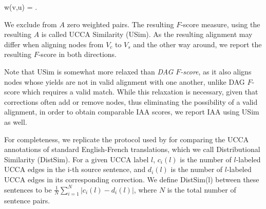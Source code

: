 \documentclass[a4paper, 11pt]{article}
\newenvironment{myequation*}{
	\vspace{-1em}
	\begin{equation*}
}{
\end{equation*}
\vspace{-1.2em}
}
\begin{document}
\begin{small}
	\vspace{-0.1cm}
 \begin{myequation*}
  w\left(v,u\right) = .
 \end{myequation*}
 \vspace{-0.1cm}
\end{small}

We exclude from $A$ zero weighted pairs.
The resulting $F$-score measure, using the resulting $A$ is called UCCA Similarity ({\sc USim}).
As the resulting alignment may differ when aligning nodes from $V_c$ to $V_s$
and the other way around, we report the resulting $F$-score in both directions.

Note that {\sc USim} is somewhat more relaxed than {\it DAG $F$-score},
as it also aligns nodes whose yields are not in valid alignment with one another,
unlike DAG $F$-score which requires a valid match.
While this relaxation is necessary, given that corrections often add
or remove nodes, thus eliminating the possibility of a valid alignment,
in order to obtain comparable IAA scores, we report IAA using {\sc USim} as well.
%

For completeness, we replicate the protocol used by 
for comparing the UCCA annotations of standard English-French translations, which we call
Distributional Similarity ({\sc DistSim}).
For a given UCCA label $l$, $c_i(l)$ is the number of $l$-labeled UCCA edges
in the i-th source sentence, and $d_i(l)$ is the number of $l$-labeled UCCA edges
in its corresponding correction. We define {\sc DistSim}(l) between these
sentences to be $\frac{1}{N}\sum_{i=1}^N \vert c_i(l) - d_i(l) \vert$, where
$N$ is the total number of sentence pairs.
\end{document}
